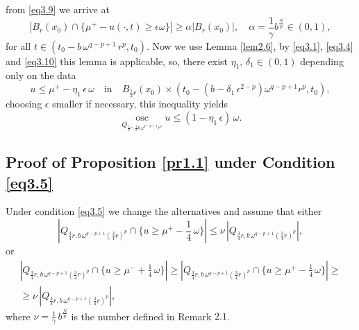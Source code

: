 \documentclass[a4paper,11pt,fullpage]{article}
\DeclareMathOperator*{\osc}{osc}
\numberwithin{equation}{section}
\begin{document}
from \eqref{eq3.9} we arrive at
\begin{equation}\label{eq3.10}
|B_r(x_0)\cap\{\mu^+-u(\cdot, t)\geqslant \epsilon \omega\}|\geqslant \alpha |B_r(x_0)|,\quad \alpha=
\frac{1}{\gamma}b^{\frac{N}{p}}\in (0, 1),
\end{equation}
for all $t\in (t_0-b\,\omega^{q-p+1}\,r^p, t_0)$. Now we use Lemma \ref{lem2.6}, by \eqref{eq3.1}, \eqref{eq3.4} and \eqref{eq3.10} this lemma is applicable, so, there exist $\eta_1$, $\delta_1 \in (0, 1)$ depending only on the data
\begin{equation*}
u\leqslant \mu^+-\eta_1\,\epsilon\,\omega\quad \text{in}\quad B_{\frac{1}{2}r}(x_0)\times (t_0-(b-\delta_1\,\epsilon^{2-p})\omega^{q-p+1} r^p, t_0),
\end{equation*}
choosing $\epsilon$ smaller if necessary, this  inequality yields
\begin{equation}\label{eq3.11}
\osc\limits_{Q_{\frac{1}{2}r, \frac{1}{2} b\,\omega^{q-p+1} r^p}} u\leqslant (1-\eta_1\,\epsilon)\,\omega.
\end{equation}




\subsection{Proof of Proposition \ref{pr1.1} under Condition \eqref{eq3.5}}

Under condition \eqref{eq3.5} we change the alternatives and  assume that  
either
\begin{equation}\label{eq3.12}
|Q_{\frac{3}{4}r, b\,\omega^{q-p+1} (\frac{3}{4}r)^p}\cap\{u\geqslant \mu^+-\frac{1}{4}\,\omega\}|\leqslant \nu\,|Q_{\frac{3}{4}r, b\,\omega^{q-p+1} (\frac{3}{4}r)^p}|,
\end{equation}
or
\begin{multline}\label{eq3.13}
|Q_{\frac{3}{4}r, b\,\omega^{q-p+1} (\frac{3}{4}r)^p}\cap\{u\geqslant \mu^- +\frac{1}{4}\,\omega\}|\geqslant
|Q_{\frac{3}{4}r, b\,\omega^{q-p+1} (\frac{3}{4} r)^p}\cap\{u\geqslant \mu^+-\frac{1}{4}\,\omega\}|\geqslant\\\geqslant \nu\,|Q_{\frac{3}{4}r, b\,\omega^{q-p+1} (\frac{3}{4} r)^p}|,
\end{multline}
where $\nu=\frac{1}{\gamma}\,b^{\frac{N}{p}}$ is the number defined in Remark $2.1$.
\end{document}
